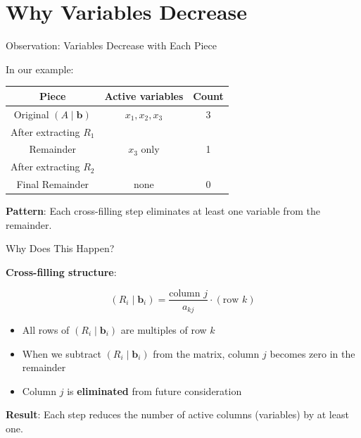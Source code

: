 \documentclass[10pt]{beamer}
\theoremstyle{definition}
\newcommand{\x}[1]{\alert{\textbf{#1}}}
\begin{document}
\section{Why Variables Decrease}

\begin{frame}{Observation: Variables Decrease with Each Piece}

In our example:

\vspace{1em}

\begin{center}
\begin{tabular}{c|c|c}
\textbf{Piece} & \textbf{Active variables} & \textbf{Count} \\
\hline
Original $(A \mid \mathbf{b})$ & $x_1, x_2, x_3$ & 3 \\
\hline
After extracting $R_1$ & & \\
Remainder & $x_3$ only & 1 \\
\hline
After extracting $R_2$ & & \\
Final Remainder & none & 0 \\
\end{tabular}
\end{center}

\vspace{1em}

\x{Pattern}: Each cross-filling step eliminates at least one variable from the remainder.

\end{frame}

\begin{frame}{Why Does This Happen?}

\x{Cross-filling structure}:

$$(R_i \mid \mathbf{b}_i) = \frac{\text{column } j}{a_{kj}} \cdot (\text{row } k)$$

\vspace{1em}

\begin{itemize}
\item All rows of $(R_i \mid \mathbf{b}_i)$ are multiples of row $k$
\item When we subtract $(R_i \mid \mathbf{b}_i)$ from the matrix, column $j$ becomes zero in the remainder
\item Column $j$ is \x{eliminated} from future consideration
\end{itemize}

\vspace{1em}

\x{Result}: Each step reduces the number of active columns (variables) by at least one.

\end{frame}
\end{document}
